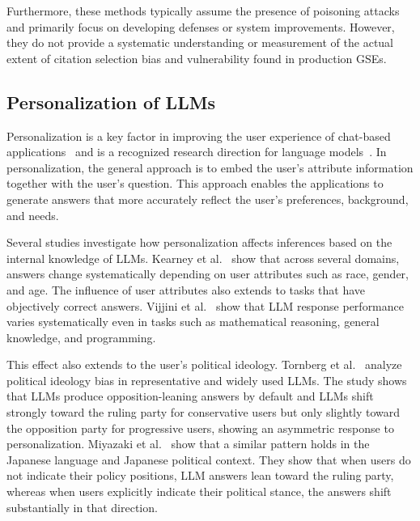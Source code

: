 Furthermore, these methods typically assume the presence of poisoning attacks and primarily focus on developing defenses or system improvements. 
However, they do not provide a systematic understanding or measurement of the actual extent of citation selection bias and vulnerability found in production GSEs.


\subsection{Personalization of LLMs}
\label{sec:related_works_personalization}
Personalization is a key factor in improving the user experience of chat-based applications~\cite{openai2024memory, anthropic2025memory, google2026personal} and is a recognized research direction for language models~\cite{salemi2024lamp, mysore2024pearl}.
In personalization, the general approach is to embed the user's attribute information together with the user's question.
This approach enables the applications to generate answers that more accurately reflect the user's preferences, background, and needs.

Several studies investigate how personalization affects inferences based on the internal knowledge of LLMs.
Kearney et al.~\cite{kearney2025languagemodelschangefacts} show that across several domains, answers change systematically depending on user attributes such as race, gender, and age.
The influence of user attributes also extends to tasks that have objectively correct answers.
Vijjini et al.~\cite{exploreing-safery-in-personalization-arxiv2026} show that LLM response performance varies systematically even in tasks such as mathematical reasoning, general knowledge, and programming.

This effect also extends to the user's political ideology.
Tornberg et al.~\cite{political-bias-audit-arxiv-2026} analyze political ideology bias in representative and widely used LLMs.
The study shows that LLMs produce opposition-leaning answers by default and LLMs shift strongly toward the ruling party for conservative users but only slightly toward the opposition party for progressive users, showing an asymmetric response to personalization.
Miyazaki et al.~\cite{miyazaki_hall_2026_japan_ai_voting_advice} show that a similar pattern holds in the Japanese language and Japanese political context.
They show that when users do not indicate their policy positions, LLM answers lean toward the ruling party, whereas when users explicitly indicate their political stance, the answers shift substantially in that direction.

